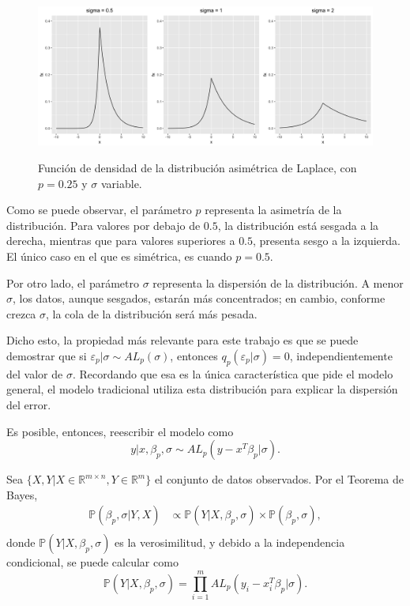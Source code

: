 \begin{figure}[H]
	\centering
	\caption{Funci\'on de densidad de la distribuci\'on asim\'etrica de Laplace, con $p = 0.25$ y $\sigma$ variable.}
	\includegraphics[width=1\textwidth]{Figures/ALD/sigma_plots.png}
	\label{p_plots}
\end{figure}

Como se puede observar, el par\'ametro $p$ representa la asimetr\'ia de la distribuci\'on. Para valores por debajo de $0.5$, la distribuci\'on est\'a sesgada a la derecha, mientras que para valores superiores a $0.5$, presenta sesgo a la izquierda. El \'unico caso en el que es sim\'etrica, es cuando $p = 0.5$. 

Por otro lado, el par\'ametro $\sigma$ representa la dispersi\'on de la distribuci\'on. A menor $\sigma$, los datos, aunque sesgados, estar\'an m\'as concentrados; en cambio, conforme crezca $\sigma$, la cola de la distribuci\'on ser\'a m\'as pesada.

Dicho esto, la propiedad m\'as relevante para este trabajo es que se puede demostrar que si $\varepsilon_p|\sigma \sim AL_p(\sigma)$, entonces $q_p(\varepsilon_p|\sigma) = 0$, independientemente del valor de $\sigma$. Recordando que esa es la \'unica caracter\'istica que pide el modelo general, el modelo tradicional utiliza esta distribuci\'on para explicar la dispersi\'on del error.

Es posible, entonces, reescribir el modelo como
\begin{equation*}
    y | x, \beta_p, \sigma 
    \sim 
    AL_p(y - x^T\beta_p|\sigma).
\end{equation*}

Sea $\{X,Y | X \in \mathbb{R}^{m \times n}, Y \in \mathbb{R}^m\}$ el conjunto de datos observados. Por el Teorema de Bayes,
\begin{equation*}
\begin{aligned}
    \mathbb{P}(\beta_p,\sigma | Y, X) 
    &\propto \mathbb{P}(Y| X, \beta_p, \sigma) \times \mathbb{P}(\beta_p, \sigma), \\
\end{aligned}
\end{equation*}
donde $\mathbb{P}(Y| X, \beta_p, \sigma)$ es la verosimilitud, y debido a la independencia condicional, se puede calcular como 
\begin{equation*}
    \mathbb{P}(Y| X, \beta_p, \sigma)
    =
    \prod_{i=1}^m AL_p(y_i - x_i^T\beta_p|\sigma).
\end{equation*}

